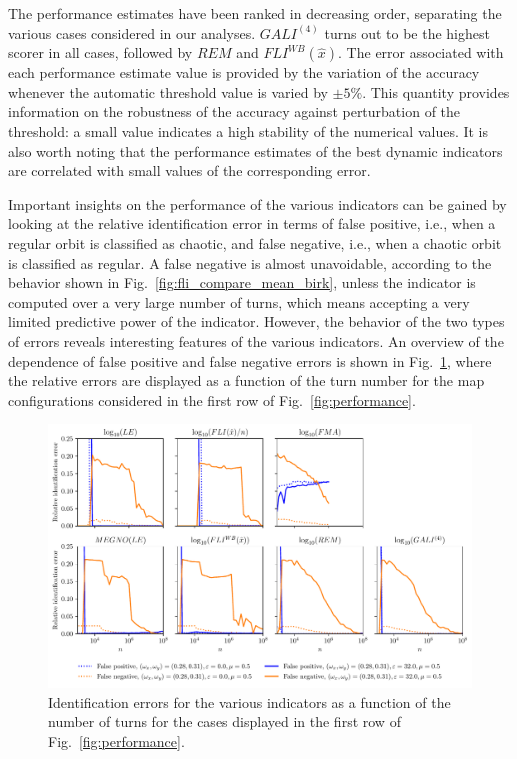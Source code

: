 The performance estimates have been ranked in decreasing order, separating the various cases considered in our analyses. $GALI^{(4)}$ turns out to be the highest scorer in all cases, followed by $REM$ and $FLI^{{WB}}(\hat{{x}})$. The error associated with each performance estimate value is provided by the variation of the accuracy whenever the automatic threshold value is varied by $\pm 5\%$. This quantity provides information on the robustness of the accuracy against perturbation of the threshold: a small value indicates a high stability of the numerical values. It is also worth noting that the performance estimates of the best dynamic indicators are correlated with small values of the corresponding error.

Important insights on the performance of the various indicators can be gained by looking at the relative identification error in terms of false positive, i.e., when a regular orbit is classified as chaotic, and false negative, i.e., when a chaotic orbit is classified as regular. A false negative is almost unavoidable, according to the behavior shown in Fig.~\ref{fig:fli_compare_mean_birk}, unless the indicator is computed over a very large number of turns, which means accepting a very limited predictive power of the indicator. However, the behavior of the two types of errors reveals interesting features of the various indicators. An overview of the dependence of false positive and false negative errors is shown in Fig.~\ref{fig:error_comparison}, where the relative errors are displayed as a function of the turn number for the map configurations considered in the first row of Fig.~\ref{fig:performance}. 
%
\begin{figure}[htp]
    \centering
    \includegraphics[width=1.0\textwidth]{6_dynamic_indicators/figs/performance_specific_1_3.pdf}
    \caption{Identification errors for the various indicators as a function of the number of turns for the cases displayed in the first row of Fig.~\ref{fig:performance}.}
    \label{fig:error_comparison}
\end{figure}
%

